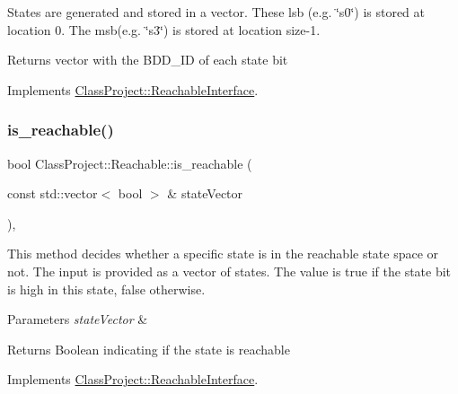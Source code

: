 States are generated and stored in a vector. These lsb (e.\+g. \char`\"{}s0\char`\"{}) is stored at location 0. The msb(e.\+g. \char`\"{}s3\char`\"{}) is stored at location size-\/1. \begin{DoxyReturn}{Returns}
vector with the B\+D\+D\+\_\+\+ID of each state bit 
\end{DoxyReturn}


Implements \hyperlink{classClassProject_1_1ReachableInterface_a8546499fbc6d0da61b6b21f8db8e4621}{Class\+Project\+::\+Reachable\+Interface}.

\mbox{\label{classClassProject_1_1Reachable_a19a40b477fc119690e0a9f1f7ffc4843}} 
\subsubsection{\texorpdfstring{is\+\_\+reachable()}{is\_reachable()}}
{\footnotesize\ttfamily bool Class\+Project\+::\+Reachable\+::is\+\_\+reachable (\begin{DoxyParamCaption}\item[{const std\+::vector$<$ bool $>$ \&}]{state\+Vector }\end{DoxyParamCaption})\hspace{0.3cm}{\ttfamily [override]}, {\ttfamily [virtual]}}

This method decides whether a specific state is in the reachable state space or not. The input is provided as a vector of states. The value is true if the state bit is high in this state, false otherwise. 
\begin{DoxyParams}{Parameters}
{\em state\+Vector} & \\
\hline
\end{DoxyParams}
\begin{DoxyReturn}{Returns}
Boolean indicating if the state is reachable 
\end{DoxyReturn}


Implements \hyperlink{classClassProject_1_1ReachableInterface_aa3011f06562431832cf563b77fb36c13}{Class\+Project\+::\+Reachable\+Interface}.

\mbox{\label{classClassProject_1_1Reachable_a53fdcc94c37cd7f0e27881678189b5c5}} 
